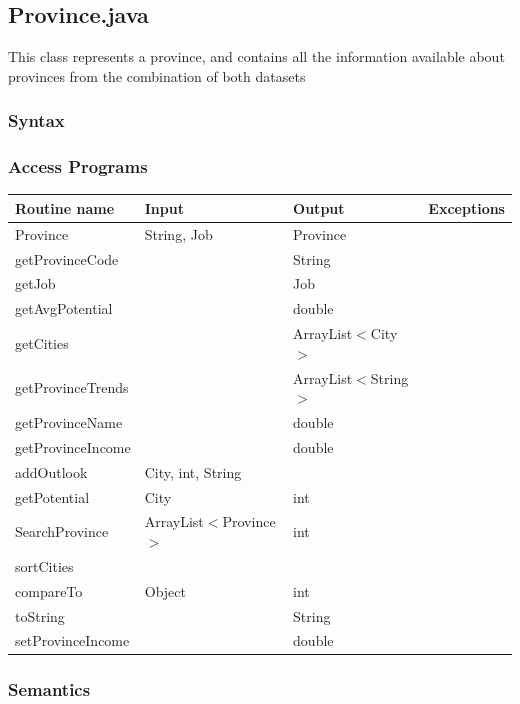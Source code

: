 \documentclass[12pt,fleqn]{article}
\begin{document}
\subsection*{Province.java}\label{prov}
This class represents a province, and contains all the information available about provinces from the combination of both datasets
\subsubsection* {Syntax}

\subsubsection* {Access Programs}
\begin{tabular}{| l | l | l | l |}
\hline
\textbf{Routine name} & \textbf{Input} & \textbf{Output} & \textbf{Exceptions}\\
\hline
Province & String, Job & Province & ~\\
\hline
 getProvinceCode& ~ & String & ~\\
\hline
getJob & ~ & Job & ~\\
\hline
getAvgPotential & ~ & double & ~\\
\hline
getCities & ~ & ArrayList$<$City$>$ & ~\\
\hline
getProvinceTrends & ~ &  ArrayList$<$String$>$ & ~\\
\hline
getProvinceName & ~ & double & ~\\
\hline
getProvinceIncome & ~ & double & ~\\
\hline
addOutlook & City, int, String & ~ & ~\\
\hline
getPotential & City & int & ~\\
\hline
SearchProvince & ArrayList$<$Province$>$ & int & ~\\
\hline
sortCities & ~ & ~ & ~\\
\hline
compareTo & Object & int & ~\\
\hline
toString & ~ & String & ~\\
\hline
setProvinceIncome & ~ & double & ~\\
\hline
\end{tabular}

\subsubsection*{Semantics}
\end{document}
